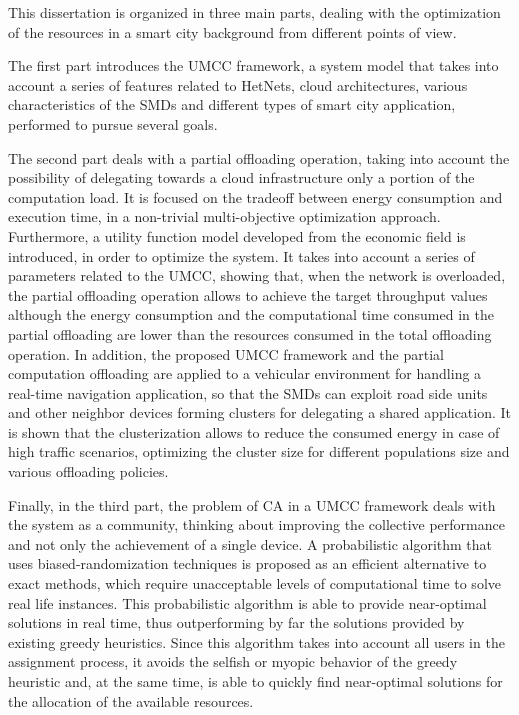 \documentclass[twoside,openright]{report}
\begin{document}
This dissertation is organized in three main parts, dealing with the optimization of the resources in a smart city background from different points of view.

The first part introduces the \gls{UMCC} framework,  a system model that takes into account a series of features related to \glspl{HetNet}, cloud architectures, various characteristics of the \glspl{SMD} and  different types of smart city application, performed to pursue several goals. 

The second part deals with a partial offloading operation, taking into account the possibility of delegating towards a cloud infrastructure only a portion of the computation load. It is focused on the tradeoff between energy consumption and execution time, in a non-trivial multi-objective optimization approach. Furthermore, a utility function model developed from the economic field is introduced, in order to optimize the system. It  takes into account a series of parameters related to the \gls{UMCC}, showing that, when the network is overloaded, the partial offloading operation allows to achieve the target throughput values although the energy consumption and the computational time consumed in the partial offloading are lower than the resources consumed in the total offloading operation. 
In addition, the proposed \gls{UMCC} framework and the partial computation offloading are applied to a vehicular environment for handling a real-time navigation application, so that the \glspl{SMD} can exploit road side units and other neighbor devices forming clusters for delegating a shared application. It is shown that the clusterization allows to reduce the consumed energy in case of high traffic scenarios, optimizing the cluster size for different populations size and various offloading policies.

Finally, in the third part, the problem of \gls{CA} in a \gls{UMCC} framework deals with the system as a community, thinking about improving the collective performance and not only the achievement of a single device.
A probabilistic algorithm that uses biased-randomization techniques is proposed as an efficient alternative to exact methods, which require unacceptable levels of computational time to solve real life instances. 
This probabilistic algorithm is able to provide near-optimal solutions in real time, thus outperforming by far the solutions provided by existing greedy heuristics. 
Since this algorithm takes into account all users in the assignment process, it avoids the selfish or myopic behavior of the greedy heuristic and, at the same time, is able to quickly find near-optimal solutions for the allocation of the available resources.
\end{document}
